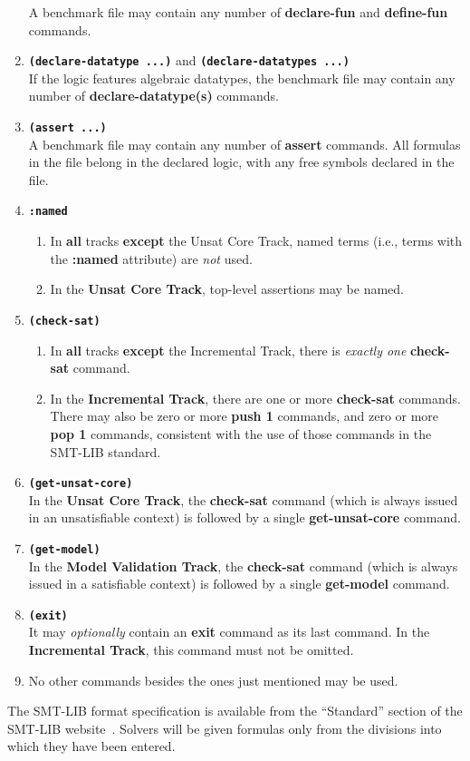 \documentclass[12pt]{article}
\newcommand{\akey}[1]{\textbf{#1}}
\newcommand{\bkey}[1]{\textbf{\texttt{#1}}}
\newcommand{\inctrack}{Incremental Track\xspace}
\newcommand{\ucoretrack}{Unsat Core Track\xspace}
\newcommand{\mvaltrack}{Model Validation Track\xspace}
\begin{document}
\begin{enumerate}
    A benchmark file may contain any number of \akey{declare-fun} and
    \akey{define-fun} commands.
  \item \bkey{(declare-datatype ...)} and \bkey{(declare-datatypes ...)}\\
    If the logic features algebraic datatypes, the benchmark file may
    contain any number of \akey{declare-datatype(s)} commands.
  \item \bkey{(assert ...)}\\
    A benchmark file may contain any number of \akey{assert} commands.  All
    formulas in the file belong in the declared logic, with any free symbols
    declared in the file.
  \item
    \bkey{:named}
    \begin{enumerate}
      \vspace{-1ex}
      \item In \textbf{all} tracks \textbf{except} the \ucoretrack,  named
        terms (i.e., terms with the \akey{:named} attribute) are \emph{not}
        used.
      \item In the \textbf{\ucoretrack}, top-level assertions may be named.
    \end{enumerate}
    \item
      \bkey{(check-sat)}
      \begin{enumerate}
        \vspace{-1ex}
        \item In \textbf{all} tracks \textbf{except} the \inctrack, there is
          \emph{exactly one} \akey{check-sat} command.
        \item In the \textbf{\inctrack}, there are one or more
        \akey{check-sat} commands.  There may also be zero or more
        \akey{push 1} commands, and zero or more \akey{pop 1} commands,
        consistent with the use of those commands in the SMT-LIB standard.
    \end{enumerate}
    \item \bkey{(get-unsat-core)}\\
    In the \textbf{\ucoretrack}, the \akey{check-sat} command (which is
      always issued in an unsatisfiable context) is followed by a single
      \akey{get-unsat-core} command.
    \item \bkey{(get-model)}\\
      In the \textbf{\mvaltrack}, the \akey{check-sat} command (which is
      always issued in a satisfiable context) is followed by a single
    \akey{get-model} command.
  \item \bkey{(exit)}\\
    It may \emph{optionally} contain an \akey{exit} command as its
    last command.  In the \textbf{\inctrack}, this command must not be
    omitted.
  \item No other commands besides the ones just mentioned may be used.
\end{enumerate}
%
The SMT-LIB format specification is available from the ``Standard''
section of the SMT-LIB website~\cite{SMT-LIB}.  Solvers will be given
formulas only from the divisions into which they have been entered.
\end{document}
